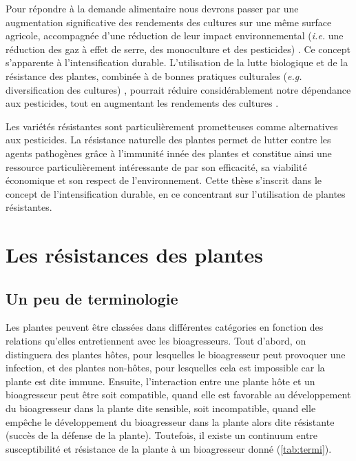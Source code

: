 	Pour répondre à la demande alimentaire nous devrons passer  par une augmentation significative  des rendements des cultures sur une même surface agricole, accompagnée d'une réduction de leur impact  environnemental (\textit{i.e.} une réduction des gaz à effet de serre, des monoculture et des pesticides) \citep{Godfray2010}.  Ce concept s'apparente à l'intensification durable.
L'utilisation de la lutte biologique et de la résistance des plantes, combinée à de bonnes pratiques culturales (\textit{e.g.} diversification des cultures) , pourrait réduire considérablement notre dépendance aux pesticides, tout en augmentant  les  rendements des cultures \citep{Foley2005, Stukenbrock2008, Pretty2008, Zhan2015, vanLenteren2018}.
                                  
	Les variétés résistantes sont particulièrement prometteuses comme
alternatives aux pesticides.  La résistance naturelle des
plantes permet de lutter contre les agents pathogènes grâce à l’immunité innée des plantes et  constitue ainsi une ressource particulièrement intéressante de par son efficacité,  sa viabilité  économique et son respect de l’environnement.
	Cette thèse s'inscrit dans le concept de l’intensification durable,  en ce concentrant sur l'utilisation de plantes résistantes.


\section{Les résistances des plantes} \label{sec:resistance}

\subsection{Un peu de terminologie} \label{terminologie}

Les plantes peuvent être classées dans différentes catégories en fonction des relations qu’elles entretiennent avec les bioagresseurs.  Tout d’abord, on distinguera des plantes hôtes, pour lesquelles le bioagresseur  peut provoquer une infection, et des plantes non-hôtes, pour lesquelles cela est impossible car la plante est dite \og immune\fg. Ensuite, l’interaction entre une plante hôte et un bioagresseur peut  être soit compatible, quand elle est favorable au développement du bioagresseur dans la plante dite \og sensible\fg, soit incompatible, quand elle empêche le développement du bioagresseur dans la plante alors dite \og résistante\fg{} (succès de la défense de la plante). Toutefois, il existe un continuum entre susceptibilité et résistance de la plante à un bioagresseur donné (\autoref{tab:termi}).


